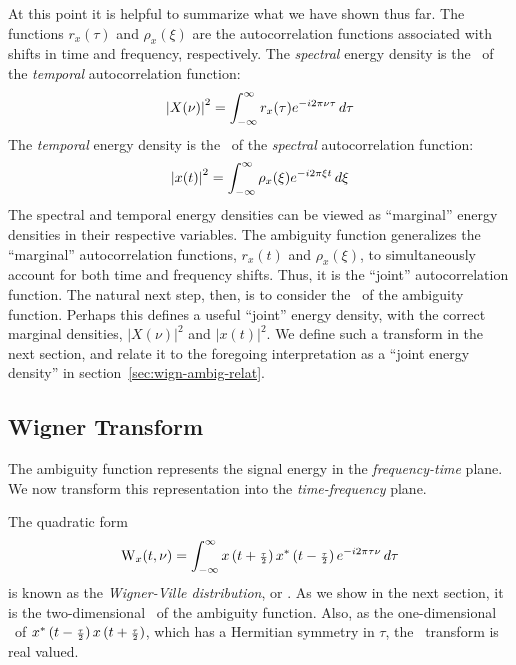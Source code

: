 At this point it is helpful to summarize what we have shown thus
far.  The functions $r_x(\tau)$ and $\rho_x(\xi)$ are the
autocorrelation functions associated with shifts in time and frequency,
respectively.  The \emph{spectral} energy density is the \FT\ of the
\emph{temporal} autocorrelation function:
\[
\left|X(\nu)\right|^2 = \int_{-\infty}^{\infty} r_x(\tau)e^{-i2\pi\nu\tau}\,d\tau
\]
The \emph{temporal} energy density is the \FT\ of the
\emph{spectral} autocorrelation function:
\[
\left|x(t)\right|^2 = \int_{-\infty}^{\infty} \rho_x(\xi)e^{-i2\pi\xi t}\,d\xi
\]
The spectral and temporal energy densities can be viewed as
``marginal'' energy densities in their respective variables.
The ambiguity function generalizes the ``marginal'' autocorrelation
functions, $r_x(t)$ and $\rho_x(\xi)$, to simultaneously account for
both time and frequency shifts.  
Thus, it is the ``joint'' autocorrelation function.  The
natural next step, then, is to consider the \FT\ of the ambiguity
function.  Perhaps this defines a useful ``joint'' energy density,
with the correct marginal densities, 
$\left|X(\nu)\right|^2$ and $\left|x(t)\right|^2$.  We define such a 
transform in the next section, and relate it to the foregoing
interpretation as a ``joint energy density'' in
section~\ref{sec:wign-ambig-relat}.

{\subsection{Wigner Transform\protect\footnotemark}
}
The ambiguity function represents the signal energy %
in the {\it frequency-time} plane.  We now transform this
representation into the {\it time-frequency} plane.

The quadratic form
\begin{equation} \label{eqn:WignerVille}
\operatorname{W}_x(t,\nu) = 
\int_{-\infty}^{\infty} x\left(t+{\scriptstyle \frac{\tau}{2}}\right) x^*\left(t-{\scriptstyle \frac{\tau}{2}}\right) e^{-i2\pi \tau\nu}\,d\tau
\end{equation}
is known as the \emph{Wigner-Ville distribution}, or \emph{\WT}.
As we show in the next section, it is the two-dimensional \FT\ of the
ambiguity function.  Also, as the one-dimensional \FT\ of 
$x^*\left(t-{\scriptstyle \frac{\tau}{2}}\right) x\left(t+{\scriptstyle \frac{\tau}{2}}\right)$, which has a Hermitian symmetry in $\tau$, the
\WV\ transform is real valued. 


